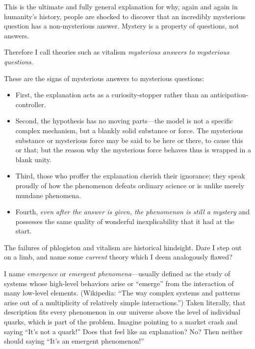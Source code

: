 {
 This is the ultimate and fully general explanation for why, again
and again in humanity's history, people are shocked to
discover that an incredibly mysterious question has a non-mysterious
answer. Mystery is a property of questions, not answers.}

{
 Therefore I call theories such as vitalism \textit{mysterious
answers to mysterious questions}.}

{
 These are the signs of mysterious answers to mysterious
questions:}

\begin{itemize}
\item {
 First, the explanation acts as a curiosity-stopper rather than an
anticipation-controller.}

\item {
 Second, the hypothesis has no moving parts---the model is not a
specific complex mechanism, but a blankly solid substance or force. The
mysterious substance or mysterious force may be said to be here or
there, to cause this or that; but the reason why the mysterious force
behaves thus is wrapped in a blank unity.}

\item {
 Third, those who proffer the explanation cherish their ignorance;
they speak proudly of how the phenomenon defeats ordinary science or is
unlike merely mundane phenomena.}

\item {
 Fourth, \textit{even after the answer is given, the phenomenon is
still a mystery} and possesses the same quality of wonderful
 inexplicability that it had at the start.}

\end{itemize}

\myendsectiontext


\bigskip

\label{futility_of_emergence}

{
 The failures of phlogiston and vitalism are historical hindsight.
Dare I step out on a limb, and name some \textit{current} theory which
I deem analogously flawed? }

{
 I name \textit{emergence} or \textit{emergent
phenomena}{}---usually defined as the study of systems whose high-level
behaviors arise or ``emerge'' from
the interaction of many low-level elements. (Wikipedia:
``The way complex systems and patterns arise out of a
multiplicity of relatively simple interactions.'')
Taken literally, that description fits every phenomenon in our universe
above the level of individual quarks, which is part of the problem.
Imagine pointing to a market crash and saying
``It's not a
quark!'' Does that feel like an explanation? No? Then
neither should saying ``It's an
emergent phenomenon!''}

